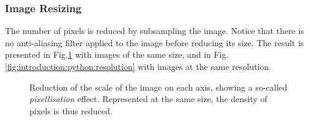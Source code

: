 \subsubsection{Image Resizing}
The number of pixels is reduced by subsampling the image. Notice that there is no anti-aliasing filter applied to the image before reducing its size. The result is presented in Fig.\ref{fig:introduction:python:resizing} with images of the same size, and in Fig.\ref{fig:introduction:python:resolution} with images at the same resolution.

\begin{figure}[H]
 \centering\caption{Reduction of the scale of the image on each axis, showing a so-called \textit{pixellisation} effect. Represented at the same size, the density of pixels is thus reduced.}%
 \hfill
 \hfill
 \label{fig:introduction:python:resizing}
\end{figure}

\vspace*{-7mm}

